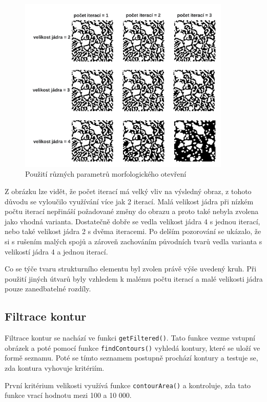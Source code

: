\begin{figure}[h]
	\centering
	\includegraphics[width=0.9\textwidth]{obrazky/morpho_params.png}
	\caption{Použití různých parametrů morfologického otevření}
	\label{morpho_param}
\end{figure} 

Z obrázku lze vidět, že počet iterací má velký vliv na výsledný obraz, z tohoto důvodu se vyloučilo využívání více jak 2 iterací. Malá velikost jádra při nízkém počtu iterací nepřináší požadované změny do obrazu a proto také nebyla zvolena jako vhodná varianta. Dostatečně dobře se vedla velikost jádra 4 s jednou iterací, nebo také velikost jádra 2 s dvěma iteracemi. Po delším pozorování se ukázalo, že si s rušením malých spojů a zároveň zachováním původních tvarů vedla varianta s velikostí jádra 4 a jednou iterací.  

Co se týče tvaru strukturního elementu byl zvolen právě výše uvedený kruh. Při použití jiných útvarů byly vzhledem k malému počtu iterací a malé velikosti jádra pouze zanedbatelné rozdíly.


\subsection{Filtrace kontur}

Filtrace kontur se nachází ve funkci \texttt{getFiltered()}. Tato funkce vezme vstupní obrázek a poté pomocí funkce \texttt{findContours()} vyhledá kontury, které se uloží ve formě seznamu. Poté se tímto seznamem postupně prochází kontury a testuje se, zda kontura vyhovuje kritériím. 

První kritérium velikosti využívá funkce \texttt{contourArea()} a kontroluje, zda tato funkce vrací hodnotu mezi 100 a 10 000.

